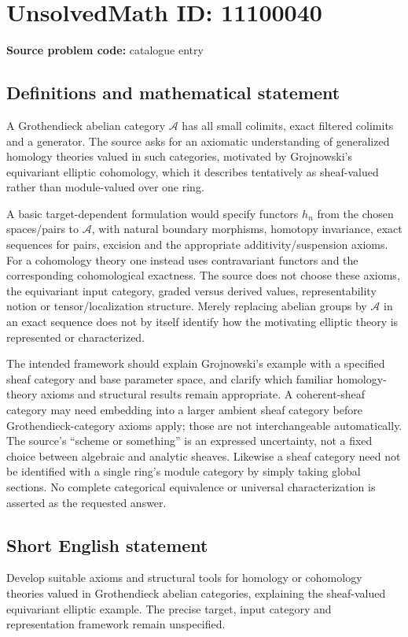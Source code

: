 \documentclass[11pt]{article}
\begin{document}
\section*{UnsolvedMath ID: 11100040}
\textbf{Source problem code:} catalogue entry
\subsection{Definitions and mathematical statement}
A Grothendieck abelian category \(\mathcal A\) has all small colimits, exact filtered colimits and a generator. The source asks for an axiomatic understanding of generalized homology theories valued in such categories, motivated by Grojnowski's equivariant elliptic cohomology, which it describes tentatively as sheaf-valued rather than module-valued over one ring.

A basic target-dependent formulation would specify functors \(h_n\) from the chosen spaces/pairs to \(\mathcal A\), with natural boundary morphisms, homotopy invariance, exact sequences for pairs, excision and the appropriate additivity/suspension axioms. For a cohomology theory one instead uses contravariant functors and the corresponding cohomological exactness. The source does not choose these axioms, the equivariant input category, graded versus derived values, representability notion or tensor/localization structure. Merely replacing abelian groups by \(\mathcal A\) in an exact sequence does not by itself identify how the motivating elliptic theory is represented or characterized.

The intended framework should explain Grojnowski's example with a specified sheaf category and base parameter space, and clarify which familiar homology-theory axioms and structural results remain appropriate. A coherent-sheaf category may need embedding into a larger ambient sheaf category before Grothendieck-category axioms apply; those are not interchangeable automatically. The source's ``scheme or something'' is an expressed uncertainty, not a fixed choice between algebraic and analytic sheaves. Likewise a sheaf category need not be identified with a single ring's module category by simply taking global sections. No complete categorical equivalence or universal characterization is asserted as the requested answer.
\subsection{Short English statement}
Develop suitable axioms and structural tools for homology or cohomology theories valued in Grothendieck abelian categories, explaining the sheaf-valued equivariant elliptic example. The precise target, input category and representation framework remain unspecified.
\end{document}
